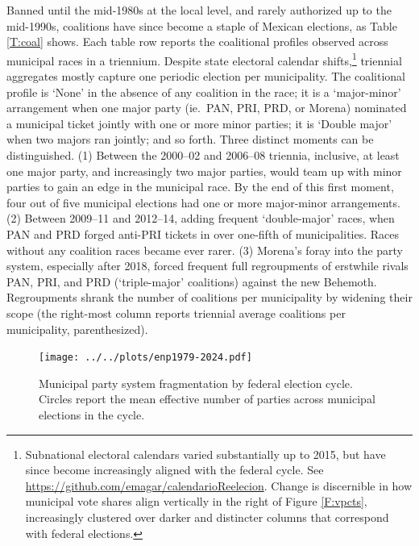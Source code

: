 \documentclass[letter,12pt]{article}
\begin{document}
Banned until the mid-1980s at the local level, and rarely authorized up to the mid-1990s, coalitions have since become a staple of Mexican elections, as Table \ref{T:coal} shows. Each table row reports the coalitional profiles observed across municipal races in a triennium. Despite state electoral calendar shifts,\footnote{Subnational electoral calendars varied substantially up to 2015, but have since become increasingly aligned with the federal cycle. See \url{https://github.com/emagar/calendarioReelecion}. Change is discernible in how municipal vote shares align vertically in the right of Figure \ref{F:vpcts}, increasingly clustered over darker and distincter columns that correspond with federal elections.} triennial aggregates mostly capture one periodic election per municipality. The coalitional profile is `None' in the absence of any coalition in the race; it is a `major-minor' arrangement when one major party (ie.\ PAN, PRI, PRD, or Morena) nominated a municipal ticket jointly with one or more minor parties; it is `Double major' when two majors ran jointly; and so forth. Three distinct moments can be distinguished. (1) Between the 2000--02 and 2006--08 triennia, inclusive, at least one major party, and increasingly two major parties, would team up with minor parties to gain an edge in the municipal race. By the end of this first moment, four out of five municipal elections had one or more major-minor arrangements. (2) Between 2009--11 and 2012--14, adding frequent `double-major' races, when PAN and PRD forged anti-PRI tickets in over one-fifth of municipalities. Races without any coalition races became ever rarer. (3) Morena's foray into the party system, especially after 2018, forced frequent full regroupments of erstwhile rivals PAN, PRI, and PRD (`triple-major' coalitions) against the new Behemoth. Regroupments shrank the number of coalitions per municipality by widening their scope (the right-most column reports triennial average coalitions per municipality, parenthesized).


\begin{figure}
  \texttt{[image: ../../plots/enp1979-2024.pdf]}
  \caption{Municipal party system fragmentation by federal election cycle. Circles report the mean effective number of parties across municipal elections in the cycle.}\label{F:enp}
\end{figure}
\end{document}
